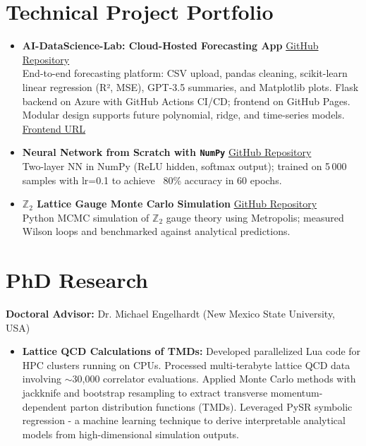 \documentclass[11pt]{article}
\begin{document}
\section*{Technical Project Portfolio}
\vspace{-0.3em}
\begin{itemize}
    \item \textbf{AI-DataScience-Lab: Cloud-Hosted Forecasting App}  
    \hfill \href{https://github.com/Hariprashad-Ravikumar/AI-DataScience-Lab}{GitHub Repository} \\
    End-to-end forecasting platform: CSV upload, pandas cleaning, scikit-learn linear regression (R², MSE), GPT-3.5 summaries, and Matplotlib plots. Flask backend on Azure with GitHub Actions CI/CD; frontend on GitHub Pages. Modular design supports future polynomial, ridge, and time-series models.  
    \href{https://hariprashad-ravikumar.github.io/AI-DataScience-Lab}{Frontend URL}

    \item \textbf{Neural Network from Scratch with \texttt{NumPy}}  
    \hfill \href{https://github.com/Hariprashad-Ravikumar/Neural-Network-from-Scratch-with-NumPy}{GitHub Repository} \\
    Two-layer NN in NumPy (ReLU hidden, softmax output); trained on 5\,000 samples with lr=0.1 to achieve ~80\% accuracy in 60 epochs.  

    \item \textbf{$\mathbb{Z}_2$ Lattice Gauge Monte Carlo Simulation}  
    \hfill \href{https://github.com/Hariprashad-Ravikumar/Z2_LatticeGauge_Monte_Carlo_Simulation}{GitHub Repository} \\
    Python MCMC simulation of $\mathbb{Z}_2$ gauge theory using Metropolis; measured Wilson loops and benchmarked against analytical predictions.
\end{itemize}


\section*{PhD Research}
\vspace{-0.3em}
\textbf{Doctoral Advisor:} Dr. Michael Engelhardt (New Mexico State University, USA)
\begin{itemize}
    \item \textbf{Lattice QCD Calculations of TMDs:} Developed parallelized Lua code for HPC clusters running on CPUs. Processed multi-terabyte lattice QCD data involving $\sim$30,000 correlator evaluations. Applied Monte Carlo methods with jackknife and bootstrap resampling to extract transverse momentum-dependent parton distribution functions (TMDs). Leveraged PySR symbolic regression - a machine learning technique to derive interpretable analytical models from high-dimensional simulation outputs.
\end{itemize}
\end{document}
